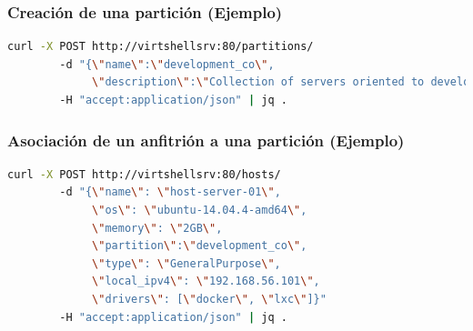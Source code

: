 \documentclass[xcolor=dvipsnames,table]{beamer} %
\begin{document}


\begin{frame}[fragile]
	\frametitle{Creación de una partición (Ejemplo)}
	\begin{lstlisting}[language=Bash,basicstyle=\ttfamily\scriptsize,keywordstyle=\color{blue}]
	curl -X POST http://virtshellsrv:80/partitions/ 
	    -d "{\"name\":\"development_co\",
	         \"description\":\"Collection of servers oriented to development team in Colombia.\"}" 
	    -H "accept:application/json" | jq .
	\end{lstlisting}
\end{frame}

\begin{frame}[fragile]
	\frametitle{Asociación de un anfitrión a una partición (Ejemplo)}
	\begin{lstlisting}[language=Bash,basicstyle=\ttfamily\scriptsize,keywordstyle=\color{blue}]
	curl -X POST http://virtshellsrv:80/hosts/ 
	    -d "{\"name\": \"host-server-01\", 
	         \"os\": \"ubuntu-14.04.4-amd64\", 
	         \"memory\": \"2GB\", 
	         \"partition\":\"development_co\", 
	         \"type\": \"GeneralPurpose\", 
	         \"local_ipv4\": \"192.168.56.101\", 
	         \"drivers\": [\"docker\", \"lxc\"]}" 
	    -H "accept:application/json" | jq .
	\end{lstlisting}
\end{frame}
\end{document}
